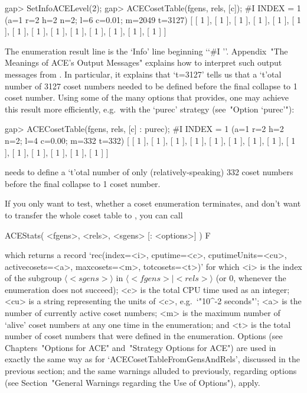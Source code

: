 \beginexample
gap> SetInfoACELevel(2);
gap> ACECosetTable(fgens, rels, [c]);
#I  INDEX = 1 (a=1 r=2 h=2 n=2; l=6 c=0.01; m=2049 t=3127)
[ [ 1 ], [ 1 ], [ 1 ], [ 1 ], [ 1 ], [ 1 ], [ 1 ], [ 1 ], [ 1 ], [ 1 ], 
  [ 1 ], [ 1 ], [ 1 ], [ 1 ] ]
\endexample

The enumeration result line is the `Info' line beginning \lq{}`\#I ''.
Appendix~"The Meanings of  ACE's  Output  Messages"  explains  how  to
interpret such output messages from {\ACE}. In particular, it explains
that `t=3127' tells us that a `t'otal number  of  3127  coset  numbers
needed to be defined before the final  collapse  to  1  coset  number.
Using some of the many options that {\ACE} provides, one  may  achieve
this  result  more  efficiently,  e.g.~with   the   `purec'   strategy
(see~"Option `purec'"):

\beginexample
gap> ACECosetTable(fgens, rels, [c] : purec);
#I  INDEX = 1 (a=1 r=2 h=2 n=2; l=4 c=0.00; m=332 t=332)
[ [ 1 ], [ 1 ], [ 1 ], [ 1 ], [ 1 ], [ 1 ], [ 1 ], [ 1 ], [ 1 ], [ 1 ], 
  [ 1 ], [ 1 ], [ 1 ], [ 1 ] ]
\endexample

{\ACE} needs to define a `t'otal number of only  (relatively-speaking)
332 coset numbers before the final collapse to 1 coset number.

\enditems


\beginitems

If you only want to  test, whether a coset enumeration terminates, and
don't want to  transfer the whole coset table  to {\GAP}, you can call

\>ACEStats( <fgens>, <rels>, <sgens> [: <options>] ) F

which returns a record `rec(index=<i>, cputime=<c>, cputimeUnits=<cu>,
activecosets=<a>, maxcosets=<m>, totcosets=<t>)' for which <i> is  the
index of the subgroup $\langle <sgens> \rangle$  in  $\langle  <fgens>
\mid <rels> \rangle$  (or  $0$,  whenever  the  enumeration  does  not
succeed); <c> is the total CPU time used as  an  integer;  <cu>  is  a
string representing the units of <c>, e.g.~`"10^-2 seconds"';  <a>  is
the number of currently active  coset  numbers;  <m>  is  the  maximum
number  of  \lq{}alive'  coset  numbers  at  any  one  time   in   the
enumeration; and <t> is the total number of coset  numbers  that  were
defined in the enumeration. Options (see  Chapters~"Options  for  ACE"
and~"Strategy Options for ACE") are used in exactly the  same  way  as
for `ACECosetTableFromGensAndRels', discussed in the previous section;
and the same warnings alluded to previously,  regarding  options  (see
Section~"General Warnings regarding the Use of Options"), apply.

